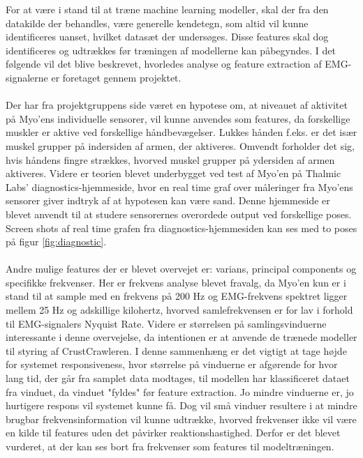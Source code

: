 For at være i stand til at træne machine learning modeller, skal der fra den datakilde der behandles, være generelle kendetegn, som altid vil kunne identificeres uanset, hvilket datasæt der undersøges. Disse features skal dog identificeres og udtrækkes før træningen af modellerne kan påbegyndes. I det følgende vil det blive beskrevet, hvorledes analyse og feature extraction af EMG-signalerne er foretaget gennem projektet.
\\\\
Der har fra projektgruppens side været en hypotese om, at niveauet af aktivitet på Myo'ens individuelle sensorer, vil kunne anvendes som features, da forskellige muskler er aktive ved forskellige håndbevægelser. Lukkes hånden f.eks. er det især muskel grupper på indersiden af armen, der aktiveres. Omvendt forholder det sig, hvis håndens fingre strækkes, hvorved muskel grupper på ydersiden af armen aktiveres. 
Videre er teorien blevet underbygget ved test af Myo'en på Thalmic Labs' diagnostics-hjemmeside\citep{myoDiagnostik}, hvor en real time graf over måleringer fra Myo'ens sensorer giver indtryk af at hypotesen kan være sand. Denne hjemmeside er blevet anvendt til at studere sensorernes overordede output ved forskellige poses. Screen shots af real time grafen fra diagnostics-hjemmesiden kan ses med to poses på figur \ref{fig:diagnostic}.\\\\
Andre mulige features der er blevet overvejet er: varians, principal components og specifikke frekvenser. Her er frekvens analyse blevet fravalg, da Myo'en kun er i stand til at sample med en frekvens på 200 Hz og EMG-frekvens spektret ligger mellem 25 Hz og adskillige kilohertz\citep{websterEMG}, hvorved samlefrekvensen er for lav i forhold til EMG-signalers Nyquist Rate. Videre er størrelsen på samlingsvinduerne interessante i denne overvejelse, da intentionen er at anvende de trænede modeller til styring af CrustCrawleren. I denne sammenhæng er det vigtigt at tage højde for systemet responsiveness, hvor størrelse på vinduerne er afgørende for hvor lang tid, der går fra samplet data modtages, til modellen har klassificeret dataet fra vinduet, da vinduet "fyldes" før feature extraction. Jo mindre vinduerne er, jo hurtigere respons vil systemet kunne få. Dog vil små vinduer resultere i at mindre brugbar frekvensinformation vil kunne udtrække, hvorved frekvenser ikke vil være en kilde til features uden det påvirker reaktionshastighed. Derfor er det blevet vurderet, at der kan ses bort fra frekvenser som features til modeltræningen.\\\\
